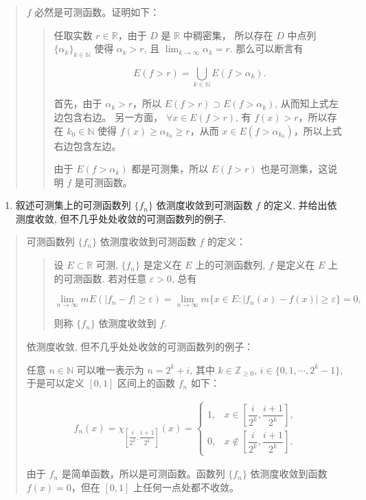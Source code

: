 \documentclass[
]{article}
\providecommand{\tightlist}{%
  \setlength{\itemsep}{0pt}\setlength{\parskip}{0pt}}
\begin{document}
\begin{quote}
\(f\) 必然是可测函数。证明如下：

\begin{quote}
任取实数 \(r \in \mathbb{R}\)，由于 \(D\) 是 \(\mathbb{R}\) 中稠密集，
所以存在 \(D\) 中点列 \(\{\alpha_k\}_{k \in \mathbb{N}}\) 使得
\(\alpha_k > r\), 且 \(\displaystyle \lim_{k \to \infty} \alpha_k = r\).
那么可以断言有

\[E(f > r) = \bigcup_{k \in \mathbb{N}} E(f > \alpha_k).\]

首先，由于 \(\alpha_k > r\)，所以 \(E(f > r) \supset E(f > \alpha_k)\),
从而知上式左边包含右边。 另一方面， \(\forall x \in E(f > r)\), 有
\(f(x) > r\)，所以存在 \(k_0 \in \mathbb{N}\) 使得
\(f(x) \geqslant \alpha_{k_0} \geqslant r\)，从而
\(x \in E(f > \alpha_{k_0})\)，所以上式右边包含左边。

由于 \(E(f > \alpha_k)\) 都是可测集，所以 \(E(f > r)\)
也是可测集，这说明 \(f\) 是可测函数。
\end{quote}
\end{quote}

\begin{enumerate}
\def\labelenumi{\arabic{enumi}.}
\setcounter{enumi}{2}
\tightlist
\item
  叙述可测集上的可测函数列 \(\{f_n\}\) 依测度收敛到可测函数 \(f\)
  的定义, 并给出依测度收敛, 但不几乎处处收敛的可测函数列的例子.
\end{enumerate}

\begin{quote}
可测函数列 \(\{f_n\}\) 依测度收敛到可测函数 \(f\) 的定义：

\begin{quote}
设 \(E \subset \mathbb{R}\) 可测, \(\{f_n\}\) 是定义在 \(E\)
上的可测函数列, \(f\) 是定义在 \(E\) 上的可测函数. 若对任意
\(\varepsilon > 0\), 总有

\[\lim\limits_{n\to\infty} m E (\lvert f_n - f \rvert \geqslant \varepsilon) = \lim\limits_{n\to\infty} m \{ x \in E \colon \lvert f_n(x) - f(x) \rvert \geqslant \varepsilon \} = 0,\]

则称 \(\{f_n\}\) 依测度收敛到 \(f\).
\end{quote}

依测度收敛, 但不几乎处处收敛的可测函数列的例子：

任意 \(n \in \mathbb{N}\) 可以唯一表示为 \(n = 2^k + i\), 其中
\(k \in \mathbb{Z}_{\geqslant 0}\), \(i \in \{0, 1, \cdots, 2^k - 1\}\),
于是可以定义 \([0, 1]\) 区间上的函数 \(f_n\) 如下：

\[\begin{aligned}
f_n(x) = \chi_{\left[ \dfrac{i}{2^k}, \dfrac{i+1}{2^k} \right]}(x) = \begin{cases}
    1, & x \in \left[ \dfrac{i}{2^k}, \dfrac{i+1}{2^k} \right], \\
    0, & x \notin \left[ \dfrac{i}{2^k}, \dfrac{i+1}{2^k} \right].
\end{cases}
\end{aligned}\]

由于 \(f_n\) 是简单函数，所以是可测函数。函数列 \(\{f_n\}\)
依测度收敛到函数 \(f(x) = 0\)，但在 \([0, 1]\) 上任何一点处都不收敛。
\end{quote}
\end{document}

